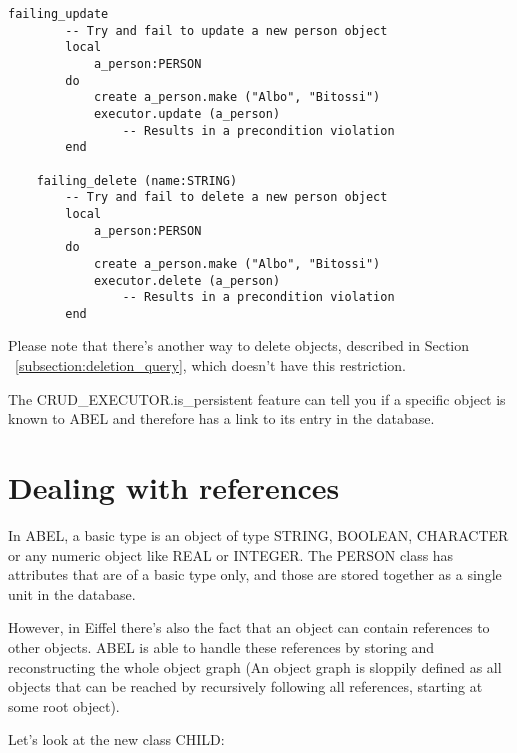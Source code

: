 \begin{lstlisting}[language=OOSC2Eiffel, captionpos=b, caption={}, label={lst:failing_update_delete}]
	failing_update
		-- Try and fail to update a new person object
		local
			a_person:PERSON
		do
			create a_person.make ("Albo", "Bitossi")
			executor.update (a_person)
				-- Results in a precondition violation
		end

	failing_delete (name:STRING)
		-- Try and fail to delete a new person object
		local
			a_person:PERSON
		do
			create a_person.make ("Albo", "Bitossi")
			executor.delete (a_person) 
				-- Results in a precondition violation
		end
\end{lstlisting}

Please note that there's another way to delete objects, described in Section ~\ref{subsection:deletion_query}, which doesn't have this restriction.

The CRUD\_EXECUTOR.is\_persistent feature can tell you if a specific object is known to ABEL and therefore has a link to its entry in the data\-base.






\section{Dealing with references}
\label {sec:references}

In ABEL, a basic type is an object of type STRING, BOOLEAN, CHARACTER or any numeric object like REAL or INTEGER.
The PERSON class has attributes that are of a basic type only, and those are stored together as a single unit in the database.

However, in Eiffel there's also the fact that an object can contain references to other objects.
ABEL is able to handle these references by storing and reconstructing the whole object graph 
(An object graph is sloppily defined as all objects that can be reached by recursively following all references, starting at some root object).

Let's look at the new class CHILD:

